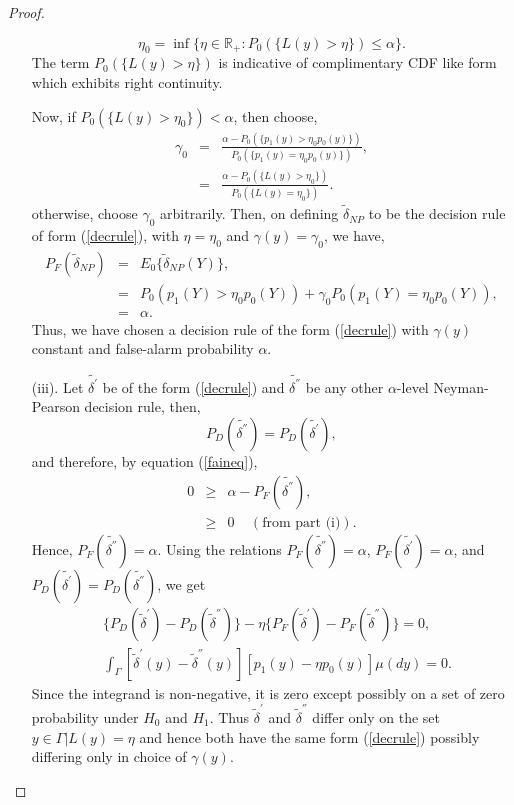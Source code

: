 \documentclass[a4paper,english,12pt]{article}
\begin{document}
\begin{proof}{}
\begin{itemize}
\begin{equation}
\eta_0 = \inf\{\eta \in \mathbb{R}_{+} : P_0 (\{L(y) > \eta\} ) \leq \alpha\}.
\end{equation}
The term $P_0(\{L(y) > \eta\} )$ is indicative of complimentary CDF like form which exhibits right continuity. 
\par Now, if $P_0(\{L(y) > \eta_0\}) < \alpha $, then choose,
\begin{eqnarray}
\gamma_0 &=& \frac{\alpha - P_0(\{p_1(y) > \eta_0 p_0(y)\})}{P_0(\{p_1(y) = \eta_0 p_0(y)\})}, \nonumber \\
&=& \frac{\alpha - P_0(\{L(y) > \eta_0\})}{P_0(\{L(y) = \eta_0\})}.
\end{eqnarray}
otherwise, choose $\gamma_0$ arbitrarily. Then, on defining ${{\tilde \delta}_{NP}}$ to be the decision rule of form (\ref{decrule}), with $\eta = \eta_0$ and $\gamma(y) = \gamma_0$, we have, 
\begin{eqnarray}
P_F({{\tilde\delta}_{NP}}) &=& E_0\{{{\tilde\delta}_{NP}}(Y)\},  \nonumber \\
&=& P_0(p_1(Y) > \eta_0 p_0(Y)) + \gamma_0 P_0(p_1(Y) = \eta_0 p_0(Y)), \nonumber \\
&=& \alpha.
\end{eqnarray}
Thus, we have chosen a decision rule of the form (\ref{decrule}) with $\gamma(y)$ constant and false-alarm probability $\alpha$. 
\item[(iii).] Let $\tilde{\delta^{'}}$ be of the form (\ref{decrule}) and $\tilde{\delta^{''}}$ be any other $\alpha$-level Neyman-Pearson decision rule, then,
\begin{equation}
P_D(\tilde{\delta^{''}}) = P_D(\tilde{\delta^{'}}),
\end{equation}
and therefore, by equation (\ref{faineq}),
\begin{eqnarray}
0 &\geq & \alpha - P_F(\tilde{\delta^{''}}), \nonumber \\
&\geq & 0 ~~~~~ (\mbox{from part (i)}). 
\end{eqnarray}
Hence, $P_F(\tilde{\delta^{''}}) = \alpha$. Using the relations $P_F(\tilde{\delta^{''}}) = \alpha$, $P_F(\tilde{\delta^{'}}) = \alpha$, and $P_D(\tilde{\delta^{'}})=P_D(\tilde{\delta^{''}})$, we get
\begin{align}
&\{ P_D({{\tilde\delta}^{'}}) - P_D({{\tilde\delta}^{''}})\} - \eta \{ P_F({{\tilde\delta}^{'}}) - P_F({{\tilde\delta}^{''}})\} = 0,  \nonumber \\
&\int_{\Gamma}[{{\tilde\delta}}^{'} (y) - {{\tilde\delta}}^{''} (y) ][p_1(y) - \eta p_0(y)]  \mu (dy) = 0. 
\end{align}
Since the integrand is non-negative, it is zero except possibly on a set of zero probability under $H_0$ and $H_1$. Thus ${{\tilde\delta}^{'}}$ and ${{\tilde\delta}^{''}}$ differ only on the set ${y \in \Gamma | L(y) = \eta}$ and hence both have the same form (\ref{decrule}) possibly differing only in choice of $\gamma(y)$.
\end{itemize}
\end{proof}
\end{document}
